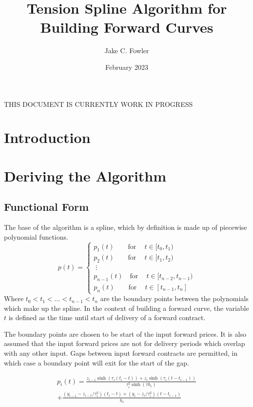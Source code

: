 \documentclass{article}
\title{Tension Spline Algorithm for Building Forward Curves}
\author{Jake C. Fowler}
\date{February 2023}
\begin{document}
\newcommand{\+}[1]{\ensuremath{\mathbf{#1}}}

\maketitle

THIS DOCUMENT IS CURRENTLY WORK IN PROGRESS

\section{Introduction}

\section{Deriving the Algorithm}
\subsection{Functional Form}
The base of the algorithm is a spline, which by definition is made up of piecewise polynomial functions.
\begin{equation}
p(t) = 
\begin{cases}
    p_1(t)\qquad \text{for}\ \quad t \in [t_0, t_1) \\
    p_2(t)\qquad \text{for}\ \quad t \in [t_1, t_2) \\
    \;\vdots \\
    p_{n-1}(t)\quad \text{for}\ \quad t \in [t_{n-2}, t_{n-1}) \\
    p_n(t)\qquad \text{for}\ \quad t \in [t_{n-1}, t_n]
\end{cases}
\end{equation}
Where $t_0 < t_1 < \hdots < t_{n-1} < t_{n}$ are the boundary points between the polynomials which make up the spline.
In the context of building a forward curve, the variable $t$ is defined as
the time until start of delivery of a forward contract.

\bigskip

The boundary points are chosen to be start of the input forward prices. It is also
assumed that the input forward prices are not for delivery periods which overlap
with any other input. Gaps between input forward contracts are permitted, in which
case a boundary point will exit for the start of the gap.

\bigskip

\begin{multline}
p_i(t) = \frac{z_{i-1} \sinh(\tau_i (t_i - t)) + z_i \sinh(\tau_i (t - t_{i-1}))}{\tau_i^2 \sinh(\tau h_i)}  \\
    + \frac{(y_{i-1} - z_{i-1}/\tau_i^2)(t_i - t) + (y_i - z_i/\tau_i^2)(t - t_{i-1})}{h_i}
\end{multline}
\end{document}
